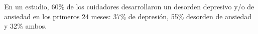 \documentclass{report}
\begin{document}
	

En un estudio, 60\% de los cuidadores desarrollaron un desorden depresivo y/o de ansiedad en los primeros 24 meses: 37\% de depresi\'on, 55\% desorden de ansiedad y 32\% ambos. \citep{karlijn2014}
\end{document}
